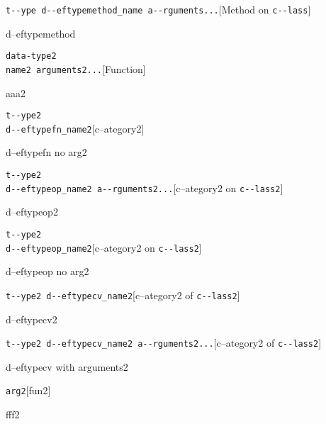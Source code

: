 \documentclass{book}
\begin{document}
\noindent\texttt{t{-}{-}ype d{-}{-}eftypemethod\_name a{-}{-}rguments...}\hfill[Method on \texttt{c{-}{-}lass}]



%
d--eftypemethod


\noindent\texttt{data-type2\leavevmode{}\\name2 arguments2...}\hfill[Function]



%
aaa2

\noindent\texttt{t{-}{-}ype2\leavevmode{}\\d{-}{-}eftypefn\_name2}\hfill[c--ategory2]



%
d--eftypefn no arg2

\noindent\texttt{t{-}{-}ype2\leavevmode{}\\d{-}{-}eftypeop\_name2 a{-}{-}rguments2...}\hfill[c--ategory2 on \texttt{c{-}{-}lass2}]



%
d--eftypeop2

\noindent\texttt{t{-}{-}ype2\leavevmode{}\\d{-}{-}eftypeop\_name2}\hfill[c--ategory2 on \texttt{c{-}{-}lass2}]



%
d--eftypeop no arg2

\noindent\texttt{t{-}{-}ype2 d{-}{-}eftypecv\_name2}\hfill[c--ategory2 of \texttt{c{-}{-}lass2}]



%
d--eftypecv2

\noindent\texttt{t{-}{-}ype2 d{-}{-}eftypecv\_name2 a{-}{-}rguments2...}\hfill[c--ategory2 of \texttt{c{-}{-}lass2}]



%
d--eftypecv with arguments2

\noindent\texttt{arg2}\hfill[fun2]



%
fff2
\end{document}
